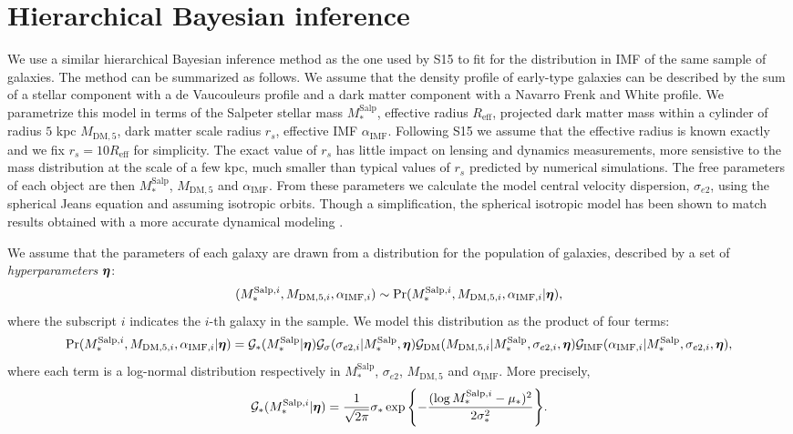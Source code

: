 \documentclass[usenatbib, letters]{mnras}
\newcommand{\boldsymbol}[1]{\mbox{\boldmath{${#1}$}}}
\def\mdm{M_{\mathrm{DM}}}
\def\reff{R_{\mathrm{eff}}}
\def\msalp{M_*^{\mathrm{Salp}}}
\def\aimf{\alpha_{\mathrm{IMF}}}
\def\mdm{M_{\mathrm{DM},5}}
\def\sigmaee{\sigma_{e2}}
\def\pr{{\rm Pr}}
\def\hyperp{\boldsymbol{\eta}}
\def\msalpi{M_*^{\mathrm{Salp},i}}
\def\aimfi{\alpha_{\mathrm{IMF},i}}
\def\mdmi{M_{\mathrm{DM},5,i}}
\def\sigmaeei{\sigma_{e2,i}}
\begin{document}
\section{Hierarchical Bayesian inference}\label{sect:appendix}
We use a similar hierarchical Bayesian inference method as the one used by S15 to fit for the distribution in IMF of the same sample of galaxies. The method can be summarized as follows.
We assume that the density profile of early-type galaxies can be described by the sum of a stellar component with a de Vaucouleurs profile and a dark matter component with a Navarro Frenk and White \citep{NFW97} profile.
We parametrize this model in terms of the Salpeter stellar mass $\msalp$, effective radius $\reff$, projected dark matter mass within a cylinder of radius $5$ kpc $\mdm$, dark matter scale radius $r_s$, effective IMF $\aimf$.
Following S15 we assume that the effective radius is known exactly and we fix $r_s = 10\reff$ for simplicity. The exact value of $r_s$ has little impact on lensing and dynamics measurements, more sensistive to the mass distribution at the scale of a few kpc, much smaller than typical values of $r_s$ predicted by numerical simulations.
The free parameters of each object are then $\msalp$, $\mdm$ and $\aimf$.
From these parameters we calculate the model central velocity dispersion, $\sigmaee$, using the spherical Jeans equation and assuming isotropic orbits. Though a simplification, the spherical isotropic model has been shown to match results obtained with a more accurate dynamical modeling \citep{Bar++11}.

We assume that the parameters of each galaxy are drawn from a distribution for the population of galaxies, described by a set of {\em hyperparameters} $\hyperp$:
\begin{equation}
(\msalpi, \mdmi, \aimfi) \sim \pr(\msalpi, \mdmi, \aimfi | \hyperp),
\end{equation}
where the subscript $i$ indicates the $i$-th galaxy in the sample.
We model this distribution as the product of four terms:
\begin{equation}
\pr(\msalpi, \mdmi, \aimfi| \hyperp) = \mathcal{G}_*(\msalp|\hyperp) \mathcal{G}_\sigma(\sigmaeei|\msalp, \hyperp) \mathcal{G}_{\mathrm{DM}}(\mdmi|\msalp,\sigmaeei,\hyperp) \mathcal{G}_{\mathrm{IMF}}(\aimfi|\msalp,\sigmaeei,\hyperp),
\end{equation}
where each term is a log-normal distribution respectively in $\msalp$, $\sigmaee$, $\mdm$ and $\aimf$.
More precisely,
\begin{equation}\label{eq:mstarterm}
\mathcal{G}_*(\msalpi|\hyperp) = \frac{1}{\sqrt{2\pi}}{\sigma_*}\exp{\left\{-\frac{(\log{\msalpi} - \mu_*)^2}{2\sigma_*^2}\right\}}.
\end{equation}
\end{document}
